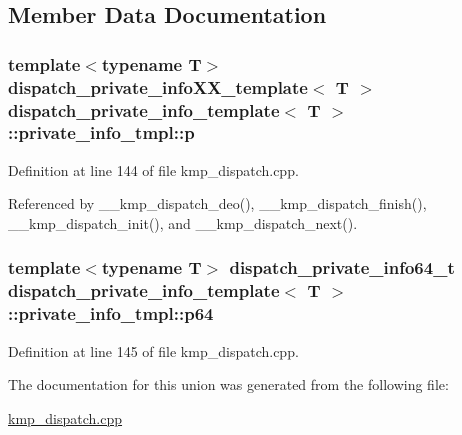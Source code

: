\subsection{Member Data Documentation}
\hypertarget{uniondispatch__private__info__template_1_1private__info__tmpl_a3524d72db291bfb9465ece3b2f8fd9af}{
\subsubsection[{p}]{\setlength{\rightskip}{0pt plus 5cm}template$<$typename T$>$ {\bf dispatch\-\_\-private\-\_\-info\-X\-X\-\_\-template}$<$ T $>$ {\bf dispatch\-\_\-private\-\_\-info\-\_\-template}$<$ T $>$\-::private\-\_\-info\-\_\-tmpl\-::p}}\label{uniondispatch__private__info__template_1_1private__info__tmpl_a3524d72db291bfb9465ece3b2f8fd9af}


Definition at line 144 of file kmp\-\_\-dispatch.\-cpp.



Referenced by \-\_\-\-\_\-kmp\-\_\-dispatch\-\_\-deo(), \-\_\-\-\_\-kmp\-\_\-dispatch\-\_\-finish(), \-\_\-\-\_\-kmp\-\_\-dispatch\-\_\-init(), and \-\_\-\-\_\-kmp\-\_\-dispatch\-\_\-next().

\hypertarget{uniondispatch__private__info__template_1_1private__info__tmpl_a048a68fb2a056c4a56815ed36290f278}{
\subsubsection[{p64}]{\setlength{\rightskip}{0pt plus 5cm}template$<$typename T$>$ {\bf dispatch\-\_\-private\-\_\-info64\-\_\-t} {\bf dispatch\-\_\-private\-\_\-info\-\_\-template}$<$ T $>$\-::private\-\_\-info\-\_\-tmpl\-::p64}}\label{uniondispatch__private__info__template_1_1private__info__tmpl_a048a68fb2a056c4a56815ed36290f278}


Definition at line 145 of file kmp\-\_\-dispatch.\-cpp.



The documentation for this union was generated from the following file\-:\begin{DoxyCompactItemize}
\item 
\hyperlink{kmp__dispatch_8cpp}{kmp\-\_\-dispatch.\-cpp}\end{DoxyCompactItemize}
